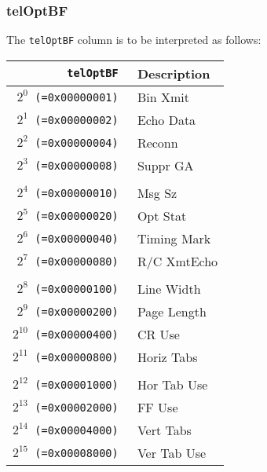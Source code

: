 \documentclass[documentation]{subfiles}
\begin{document}
\subsubsection{telOptBF}\label{telOptBF}
The {\tt telOptBF} column is to be interpreted as follows:\\
\begin{minipage}{.48\textwidth}
    \begin{longtable}{>{\tt}rl}
        \toprule
        {\bf telOptBF} & {\bf Description} \\
        \midrule\endhead%
        $2^{0}$  (=0x00000001) & Bin Xmit\\
        $2^{1}$  (=0x00000002) & Echo Data\\
        $2^{2}$  (=0x00000004) & Reconn\\
        $2^{3}$  (=0x00000008) & Suppr GA\\
        \\
        $2^{4}$  (=0x00000010) & Msg Sz\\
        $2^{5}$  (=0x00000020) & Opt Stat\\
        $2^{6}$  (=0x00000040) & Timing Mark\\
        $2^{7}$  (=0x00000080) & R/C XmtEcho\\
        \\
        $2^{8}$  (=0x00000100) & Line Width\\
        $2^{9}$  (=0x00000200) & Page Length\\
        $2^{10}$ (=0x00000400) & CR Use\\
        $2^{11}$ (=0x00000800) & Horiz Tabs\\
        \\
        $2^{12}$ (=0x00001000) & Hor Tab Use\\
        $2^{13}$ (=0x00002000) & FF Use\\
        $2^{14}$ (=0x00004000) & Vert Tabs\\
        $2^{15}$ (=0x00008000) & Ver Tab Use\\
        \bottomrule
    \end{longtable}
\end{minipage}
\hfill
\end{document}
